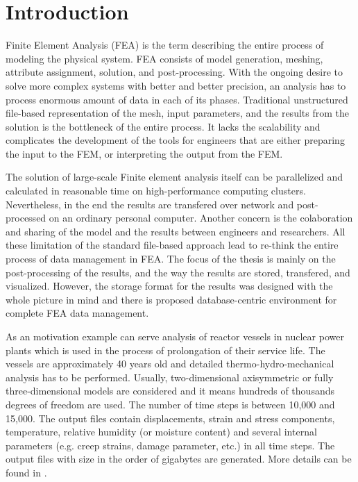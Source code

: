 \chapter{Introduction}
\label{chapter-introduction}


Finite Element Analysis (FEA) is the term describing the entire process of modeling the physical system. FEA consists of model generation, meshing, attribute assignment, solution, and post-processing. With the ongoing desire to solve more complex systems with better and better precision, an analysis has to process enormous amount of data in each of its phases. Traditional unstructured file-based representation of the mesh, input parameters, and the results from the solution is the bottleneck of the entire process. It lacks the scalability and complicates the development of the tools for engineers that are either preparing the input to the FEM, or interpreting the output from the FEM.

The solution of large-scale Finite element analysis itself can be parallelized and calculated in reasonable time on high-performance computing clusters. Nevertheless, in the end the results are transfered over network and post-processed on an ordinary personal computer. Another concern is the colaboration and sharing of the model and the results between engineers and researchers. All these limitation of the standard file-based approach lead to re-think the entire process of data management in FEA. The focus of the thesis is mainly on the post-processing of the results, and the way the results are stored, transfered, and visualized. However, the storage format for the results was designed with the whole picture in mind and there is proposed database-centric environment for complete FEA data management.

As an motivation example can serve analysis of reactor vessels in nuclear power plants which is used in the process of prolongation of their service life. The vessels are approximately 40 years old and detailed thermo-hydro-mechanical analysis has to be performed. Usually, two-dimensional axisymmetric or fully three-dimensional models are considered and it means hundreds of thousands degrees of freedom are used. The number of time steps is between 10,000 and 15,000. The output files contain displacements, strain and stress components, temperature, relative humidity (or moisture content) and several internal parameters (e.g. creep strains, damage parameter, etc.) in all time steps. The output files with size in the order of gigabytes are generated. More details can be found in \cite{XXX-1,XXX-2}.

